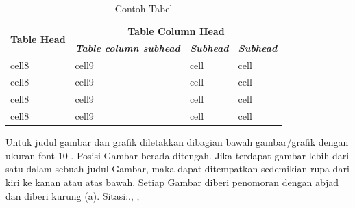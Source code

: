 \documentclass[12pt,reqno]{semhas-tesis-filkom}
\begin{document}
\begin{table}[ht]
\caption{Contoh Tabel}
\renewcommand{\arraystretch}{1.5}
\footnotesize
{}
\begin{tabularx}{\columnwidth}{|l|l|l|l|}
  \hline
  \multirow{2}{*}{\textbf{Table Head}} & \multicolumn{3}{c|}{\textbf{Table Column Head}} \\
  \cline{2-4}
  & \multicolumn{1}{C|}{\bfseries\itshape{Table column subhead}} & \bfseries\itshape{Subhead} & \bfseries\itshape{Subhead} \\ 
  \hline
  cell8 & cell9 & cell & cell \\ 
  cell8 & cell9 & cell & cell \\
  cell8 & cell9 & cell & cell \\
  cell8 & cell9 & cell & cell \\
  \hline
\end{tabularx}
\label{tab:contoh}
\end{table}

Untuk judul gambar dan grafik diletakkan dibagian bawah
gambar/grafik dengan ukuran font 10 \cite{bookseries,collection}. Posisi Gambar berada
ditengah. Jika terdapat gambar lebih dari satu dalam sebuah
judul Gambar, maka dapat ditempatkan sedemikian rupa
dari kiri ke kanan atau atas bawah. Setiap Gambar diberi
penomoran dengan abjad dan diberi kurung (a). Sitasi:.\cite{anggariawan:2014}, \cite{Bloggs1950}, \cite{abook,acceptedpub,anarticle}
\end{document}
